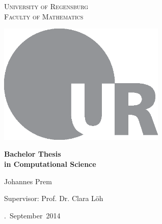\begin{titlepage}
    \begin{center}
    \scshape
        University of Regensburg\\
        Faculty of Mathematics
        
    \vspace{2cm}
    
        
    \vspace{2.5cm}
    
        \includegraphics[width=0.6\textwidth]{ur_logo.eps}
        
    \vspace{2cm}
    
        {\Large\bfseries%
            Bachelor Thesis\\
            in Computational Science}
        
    \vspace{1.3cm}
    
        Johannes Prem
        
    \vspace{0.4cm}
    
        Supervisor: Prof. Dr. Clara Löh
        
    \vfill
    
        \number\day.~September~2014
    \end{center}
\end{titlepage}

